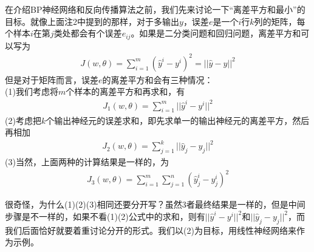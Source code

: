                 \par
                在介绍BP神经网络和反向传播算法之前，我们先来讨论一下“离差平方和最小”的目标。就像上面注2中提到的那样，对于多输出$y$，误差$e$是一个$i$行$k$列的矩阵，每个样本$i$在第$j$类处都会有个误差$e_{ij}$。如果是二分类问题和回归问题，离差平方和可以写为
                \begin{align*}
                J(w,\theta) = \sum_{i=1}^m(\hat{y}^i - y^i)^2 = ||\hat{y} - y||^2
                \end{align*}
                但是对于矩阵而言，误差$e$的离差平方和会有三种情况：\\
                (1)我们考虑将$m$个样本的离差平方和再求和，有
                \begin{align*}
                J_1(w,\theta) = \sum_{i=1}^m||\hat{y}^i - y^i||^2
                \end{align*}
                (2)考虑把$k$个输出神经元的误差求和，即先求单一的输出神经元的离差平方，然后再相加
                \begin{align*}
                J_2(w,\theta) = \sum_{j=1}^k||\hat{y}_j - y_j||^2
                \end{align*}
                (3)当然，上面两种的计算结果是一样的，为
                \begin{align*}
                J_3 (w,\theta) = \sum_{i=1}^m\sum_{j=1}^n (\hat{y}_j^i - y_j^i)^2
                \end{align*}
                \par
                很奇怪，为什么(1)(2)(3)相同还要分开写？虽然3者最终结果是一样的，但是中间步骤是不一样的，如果不看(1)(2)公式中的求和，则有$||\hat{y}^i - y^i||^2$和$||\hat{y}_j - y_j||^2$，而我们后面恰好就要着重讨论分开的形式。我们以(2)为目标，用线性神经网络来作为示例。

